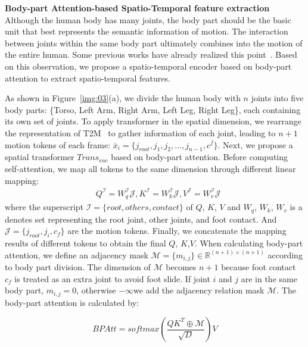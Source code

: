 \documentclass[10pt,twocolumn,letterpaper]{article}
\begin{document}
\textbf{Body-part Attention-based Spatio-Temporal feature extraction}\quad
Although the human body has many joints, the body part should be the basic unit that best represents the semantic information of motion. The interaction between joints within the same body part ultimately combines into the motion of the entire human. Some previous works have already realized this point~\cite{jang2022motion,aberman2020skeleton,hu2023pose}. Based on this observation, we propose a spatio-temporal encoder based on body-part attention to extract spatio-temporal features.

As shown in Figure~\ref{img:03}(a), we divide the human body with $n$ joints into five body parts: \{Torso, Left Arm, Right Arm, Left Leg, Right Leg\}, each containing its own set of joints. To apply transformer in the spatial dimension, we rearrange the representation of T2M~\cite{guo2022generating} to gather information of each joint, leading to $n+1$ motion tokens of each frame: $\bar{x}_i=\{j_{root},j_1,j_2,...,j_{n-1},c^f\}$. Next, we propose a spatial transformer $ {Trans_{enc}}$ based on body-part attention. Before computing self-attention, we map all tokens to the same dimension through different linear mapping:
\begin{equation}
\begin{aligned}
&Q^{\mathcal{I}}=W_q^{\mathcal{I}}\mathcal{J},K^{\mathcal{I}}=W_k^{\mathcal{I}}\mathcal{J},V^{\mathcal{I}}=W_v^{\mathcal{I}}\mathcal{J}
\end{aligned}
\label{euqa:01}
\end{equation}
where the superscript $\mathcal{I}=\{root,others,contact\}$ of $Q$, $K$, $V$ and $W_q$, $W_k$, $W_v$ is a denotes set representing the root joint, other joints, and foot contact. And $\mathcal{J}=\{j_{root}, j_i,c_f\}$ are the motion tokens. Finally, we concatenate the mapping results of different tokens to obtain the final $Q$, $K$,$V$. When calculating body-part attention, we define an adjacency mask $\mathcal{M} = \{m_{i,j}\} \in \mathbb{R}^{(n+1) \times (n+1)}$ according to body part division. The dimension of $\mathcal{M}$ becomes $n+1$ because foot contact $c_f$ is treated as an extra joint to avoid foot slide. If joint $i$ and $j$ are in the same body part, $m_{i,j}=0$, otherwise $-\infty$we add the adjacency relation mask $\mathcal{M}$. The body-part attention is calculated by:

\begin{equation}
BPAtt = softmax(\frac{QK^T \oplus \mathcal{M}}{\sqrt{D}})V
\label{euqa:02}
\end{equation}
\end{document}
